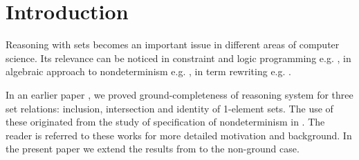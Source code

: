 \section{Introduction}

Reasoning with sets becomes an important issue in different areas of computer
science. Its relevance can be noticed in constraint and logic programming
e.g.  \cite {SD,DO,Jay,Sto}, in algebraic approach to nondeterminism e.g.
\cite {HusB,PS1,MW}, in term rewriting e.g. \cite {LA,Kap,HusB}.

In an earlier paper \cite{KW}, we proved ground-completeness of reasoning
system for three set relations:  inclusion, intersection  and
identity of 1-element sets. The use of these originated from the study
of specification of nondeterminism in \cite{MW,Mich}. The reader is referred
to these works for more detailed motivation and background.
In the present paper we extend the results from \cite{KW} to the non-ground case.

